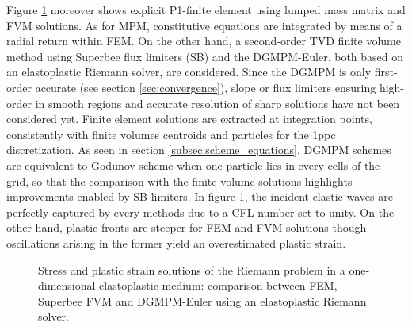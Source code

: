 Figure \ref{fig:RP_EP_dgmpm_fvm} moreover shows explicit P1-finite element using lumped mass matrix and FVM solutions. As for MPM, constitutive equations are integrated by means of a radial return within FEM. 
On the other hand, a second-order TVD finite volume method using Superbee flux limiters (SB) \cite{Thomas_EP} and the DGMPM-Euler, both based on an elastoplastic Riemann solver, are considered.
Since the DGMPM is only first-order accurate (see section \ref{sec:convergence}), slope or flux limiters \cite{vanLeer_Limiters} ensuring high-order in smooth regions and accurate resolution of sharp solutions have not been considered yet.
Finite element solutions are extracted at integration points, consistently with finite volumes centroids and particles for the 1ppc discretization.
As seen in section \ref{subsec:scheme_equations}, DGMPM schemes are equivalent to Godunov scheme when one particle lies in every cells of the grid, so that the comparison with the finite volume solutions highlights improvements enabled by SB limiters. In figure \ref{fig:RP_EP_dgmpm_fvm}, the incident elastic waves are perfectly captured by every methods due to a CFL number set to unity. On the other hand, plastic fronts are steeper for FEM and FVM solutions though oscillations arising in the former yield an overestimated plastic strain. 
\begin{figure}[h!]
  \centering
  { \label{subfig:ep_dgmpm_fvm1}}
  { \label{subfig:ep_dgmpm_fvm2}}
  { \label{subfig:ep_dgmpm_fvm3}}
  {}
  \caption{Stress and plastic strain solutions of the Riemann problem in a one-dimensional elastoplastic medium: comparison between FEM, Superbee FVM and DGMPM-Euler using an elastoplastic Riemann solver.}
  \label{fig:RP_EP_dgmpm_fvm}
\end{figure}
